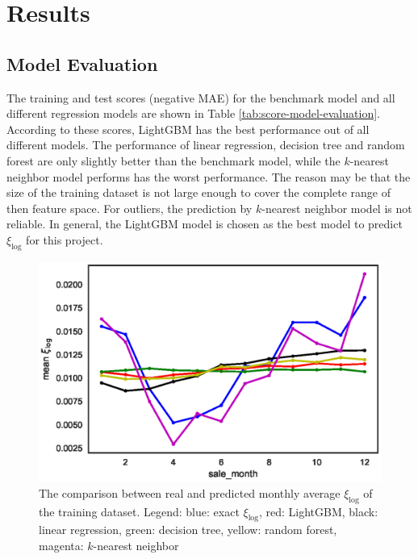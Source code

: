 \documentclass[12pt]{article}
\begin{document}
\section{Results}\label{sec:results}
\subsection{Model Evaluation}
The training and test scores (negative MAE) for the benchmark model and all different regression models are shown in Table \ref{tab:score-model-evaluation}. According to these scores, LightGBM has the best performance out of all different models. The performance of linear regression, decision tree and random forest are only slightly better than the benchmark model, while the $k$-nearest neighbor model performs has the worst performance. The reason may be that the size of the training dataset is not large enough to cover the complete range of then feature space. For outliers, the prediction by $k$-nearest neighbor model is not reliable. In general, the LightGBM model is chosen as the best model to predict $\xi_{\log}$ for this project.

\begin{figure}[!ht]
	\centering
	\includegraphics[width=0.9\linewidth]{pic/monthly-average-error-prediction}
	\caption{The comparison between real and predicted monthly average $\xi_{\log}$ of the training dataset. Legend: blue: exact $\xi_{\log}$, red: LightGBM, black: linear regression, green: decision tree, yellow: random forest, magenta: $k$-nearest neighbor }
	\label{fig:monthly-average-error-prediction}
\end{figure}
\end{document}
